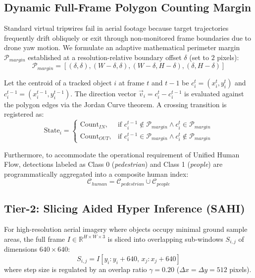 \documentclass[conference]{IEEEtran}
\begin{document}
\subsection{Dynamic Full-Frame Polygon Counting Margin}
Standard virtual tripwires fail in aerial footage because target trajectories frequently drift obliquely or exit through non-monitored frame boundaries due to drone yaw motion. We formulate an adaptive mathematical perimeter margin $\mathcal{P}_{margin}$ established at a resolution-relative boundary offset $\delta$ (set to $2$ pixels):
\begin{equation}
\mathcal{P}_{margin} = \left[ (\delta, \delta), (W - \delta, \delta), (W - \delta, H - \delta), (\delta, H - \delta) \right]
\end{equation}

Let the centroid of a tracked object $i$ at frame $t$ and $t-1$ be $c_i^t = (x_i^t, y_i^t)$ and $c_i^{t-1} = (x_i^{t-1}, y_i^{t-1})$. The direction vector $\vec{v}_i = c_i^t - c_i^{t-1}$ is evaluated against the polygon edges via the Jordan Curve theorem. A crossing transition is registered as:
\begin{equation}
\text{State}_i = 
\begin{cases}
\text{Count}_{IN}, & \text{if } c_i^{t-1} \notin \mathcal{P}_{margin} \land c_i^t \in \mathcal{P}_{margin} \\
\text{Count}_{OUT}, & \text{if } c_i^{t-1} \in \mathcal{P}_{margin} \land c_i^t \notin \mathcal{P}_{margin}
\end{cases}
\end{equation}

Furthermore, to accommodate the operational requirement of Unified Human Flow, detections labeled as Class 0 (\textit{pedestrian}) and Class 1 (\textit{people}) are programmatically aggregated into a composite human index:
\begin{equation}
\mathcal{C}_{human} = \mathcal{C}_{pedestrian} \cup \mathcal{C}_{people}
\end{equation}

\subsection{Tier-2: Slicing Aided Hyper Inference (SAHI)}
For high-resolution aerial imagery where objects occupy minimal ground sample areas, the full frame $I \in \mathbb{R}^{H \times W \times 3}$ is sliced into overlapping sub-windows $S_{i,j}$ of dimensions $640 \times 640$:
\begin{equation}
S_{i,j} = I[y_i : y_i + 640, \, x_j : x_j + 640]
\end{equation}
where step size is regulated by an overlap ratio $\gamma = 0.20$ ($\Delta x = \Delta y = 512$ pixels). 
\end{document}
